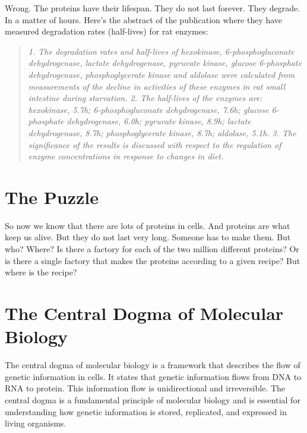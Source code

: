 Wrong. The proteins have their lifespan. They do not last forever. They degrade. In a matter of hours. Here's the abstract of the publication where they have measured degradation rates (half-lives) for rat enzymes:

\begin{quote}
    \textit{1. The degradation rates and half-lives of hexokinase, 6-phosphogluconate dehydrogenase, lactate dehydrogenase, pyruvate kinase, glucose 6-phosphate dehydrogenase, phosphoglycerate kinase and aldolase were calculated from measurements of the decline in activities of these enzymes in rat small intestine during starvation. 2. The half-lives of the enzymes are: hexokinase, 5.7h; 6-phosphogluconate dehydrogenase, 7.6h; glucose 6-phosphate dehydrogenase, 6.0h; pyruvate kinase, 8.9h; lactate dehydrogenase, 8.7h; phosphoglycerate kinase, 8.7h; aldolase, 5.1h. 3. The significance of the results is discussed with respect to the regulation of enzyme concentrations in response to changes in diet.}
\end{quote}

\section{The Puzzle}

So now we know that there are lots of proteins in cells. And proteins are what keep us alive. But they do not last very long. Someone has to make them. But who? Where? Is there a factory for each of the two million different proteins? Or is there a single factory that makes the proteins according to a given recipe? But where is the recipe?

\section{The Central Dogma of Molecular Biology}

The central dogma of molecular biology is a framework that describes the flow of genetic information in cells. It states that genetic information flows from DNA to RNA to protein. This information flow is unidirectional and irreversible. The central dogma is a fundamental principle of molecular biology and is essential for understanding how genetic information is stored, replicated, and expressed in living organisms.

